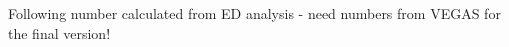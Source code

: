 \documentclass[preprint2]{aastex}
\begin{document}
Following number calculated from ED analysis - need numbers from VEGAS for the final version!
\begin{itemize}

\end{itemize}
\end{document}
